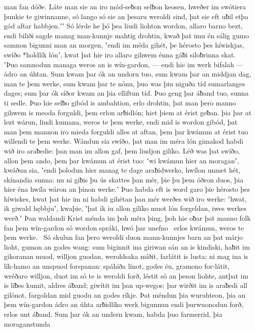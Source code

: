 man fan dóðe. Láte man sie an iro mód-seƀon
selƀon keosen, hweðer im swótiera þunkie
te giwinnanne, só lango só sie an þesaru weroldi sind,
þat sie eft uƀil etþa gód aftar habbjen.ʼʼ
Só lérde he þó þea liudi liohton wordon,
allaro barno bezt, endi biliði sagde
manag man-kunnje mahtig drohtin,
kwað þat imu én sálig gumo samnon bigunni
man an morgen, ʽendi im méda gihét,
þe hérosto þes híwiskjas, swíðo *holdlík lónʼ,
kwat þat hie iro allaro gihwem énna gáƀi
siloƀrinna skat. ʽÞuo samnodun managa
weros an is wín-gardon, — endi hie im werk bifalah —
ádro an úhtan. Sum kwam þar ók an undorn tuo,
sum kwam þar an middjan dag, man te þem werke,
sum kwam þar te nónu, þuo was þiu niguða tíd
sumarlanges dages; sum þar ók síðor kwam
an þia elliftun tíd. Þuo geng þar áƀand tuo,
sunna ti sedle. Þuo hie selƀo gibód
is ambahtion, erlo drohtin,
þat man þero manno gihwem is meoda forguldi,
þem erlon arƀidlón; hiet þiem at érist geƀan.
þia þar at lezt wárun, liudi kumana,
weros te þem werke, endi mid is wordon gibód,
þat man þem mannon iro mieda forguldi
alles at aftan, þem þar kwámun at érist tuo
willendi te þem werke. Wándun sia swíðo,
þat man im méra lón gimakod habdi
wið iro araƀedie: þan man im allon gaf,
þem liudjon gilíko. Léð was þat swíðo,
allon þem ando, þem þar kwámun at érist tuo:
ʽwi kwámun hier an moraganʼ, kwáðun sia, ʽendi þolodun hier manag te dage
araƀidwerko, hwílon unmet hét,
skínandia sunna: nu ni giƀis þu ús skattes þan mér,
þie þu þem óðron duos, þia hier éna hwíla
wáron an þínon werke.ʼ Þuo habda eft is word garo
þie hérosto þes híwiskes, kwat þat hie im ni habdi gihétan þan mér
werðes wið iro werke: ʽhwat, ik giwald hębbjuʼ, kwaþie,
ʽþat ik iu allon gilíko muot lón forgeldan,
iwes werkes werð.ʼ Þan waldandi Krist
ménda im þoh méra þing, þoh hie oƀar þat manno folk
fan þem wín-gardon só wordon spráki,
hwó þar unefno \hld\ erlos kwámun,
weros te þem werke. \hld\ Só skulun fan þero weroldi duon
mann-kunnjes barn an þat márjo lioht,
gumon an godes wang: sum biginnit ina giriwan sán
an is kindiski, haƀit im gikoranan muod,
willjon guodan, weroldsaka míðit,
farlátit is lusta; ni mag ina is lík-hamo
an unspuod forspanan: spáhiða línot,
godes éu, gramono for-látit,
wréðaro willjon, duot im só te is weroldi forð,
léstit só an þeson liohte, antþat im is líƀes kumit,
aldres áƀand; giwítit im þan up-wegos:
þar wirðit im is araƀedi all gilónot,
fargoldan mid guodu an godes ríkje.
Þat méndun þia wuruhteon, þia an þem wín-gardon
ádro an úhta arƀidlíko
werk bigunnun endi þurwuonodun forð,
erlos unt áƀand. Sum þar ók an undern kwam,
habda þuo farmerrid, þia moraganstunda
